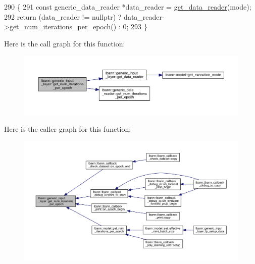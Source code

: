 \begin{DoxyCode}
290                                                                       \{
291     \textcolor{keyword}{const} generic\_data\_reader *data\_reader = \hyperlink{classlbann_1_1generic__input__layer_aba732becdb02627e3ad4493ac19e8fb6}{get\_data\_reader}(mode);
292     \textcolor{keywordflow}{return} (data\_reader != \textcolor{keyword}{nullptr}) ? data\_reader->get\_num\_iterations\_per\_epoch() : 0;
293   \}
\end{DoxyCode}
Here is the call graph for this function\+:\nopagebreak
\begin{figure}[H]
\begin{center}
\leavevmode
\includegraphics[width=350pt]{classlbann_1_1generic__input__layer_aa0fa6597ffce537f7cfba29dcc754ee1_cgraph}
\end{center}
\end{figure}
Here is the caller graph for this function\+:\nopagebreak
\begin{figure}[H]
\begin{center}
\leavevmode
\includegraphics[width=350pt]{classlbann_1_1generic__input__layer_aa0fa6597ffce537f7cfba29dcc754ee1_icgraph}
\end{center}
\end{figure}
\mbox{\label{classlbann_1_1generic__input__layer_a82bd22c834c5ef526e0c740c80451e1b}} 
